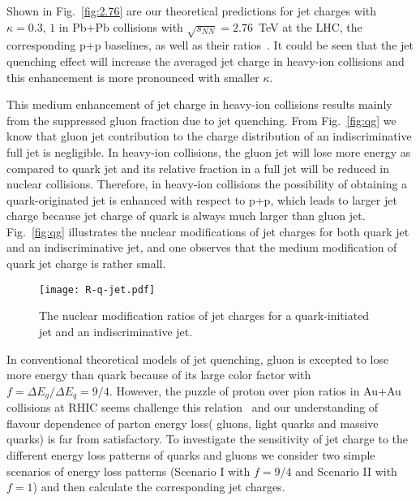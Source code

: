 \documentclass[3p,times,twocolumn]{elsarticle}
\begin{document}
Shown in Fig.~\ref{fig:2.76} are our theoretical predictions for jet charges with $\kappa=0.3,\,1$ in Pb+Pb collisions with $\sqrt{s_{NN}}=2.76$~TeV at the LHC, the corresponding p+p baselines, as well as their ratios~\cite{Chen:2016}. It could be seen that the jet quenching effect will increase the averaged jet charge in heavy-ion collisions and this enhancement is more pronounced with smaller $\kappa$.


This medium enhancement of jet charge in heavy-ion collisions results mainly from the suppressed gluon fraction due to jet quenching. From Fig.~\ref{fig:qg} we know that gluon jet contribution to the charge distribution of an indiscriminative full jet is negligible. In heavy-ion collisions, the gluon jet will lose more energy as compared to quark jet and its relative fraction in a full jet will be reduced in nuclear collisions.   Therefore, in heavy-ion collisions the possibility of obtaining a quark-originated jet is enhanced with respect to p+p, which leads to larger jet charge because jet charge of quark is always much larger than gluon jet.  Fig.~\ref{fig:qg} illustrates
the nuclear modifications of jet charges for both quark jet and an indiscriminative jet, and one observes that the medium modification of quark jet charge is rather small.

\begin{figure}[!htb]
\texttt{[image: R-q-jet.pdf]}
\caption{The nuclear modification ratios of jet charges for a quark-initiated jet and an indiscriminative jet.}
\label{fig:R-q-jet}
\end{figure}



In conventional theoretical models of jet quenching, gluon is
excepted to lose more energy than quark because of its large color factor with $f=\Delta E_{g}/\Delta E_{q}=9/4$. However, the puzzle of proton over pion ratios in Au+Au collisions at RHIC seems challenge this relation~\cite{Liu:2006sf,Chen:2008vha} and our understanding of flavour dependence of parton energy loss( gluons, light quarks and massive quarks) is far from satisfactory. To investigate the sensitivity of jet charge to the different energy loss patterns of quarks and gluons we consider two simple scenarios of energy loss patterns (Scenario I with $f=9/4$ and Scenario II with $f=1$) and then calculate the corresponding jet charges.
\end{document}
